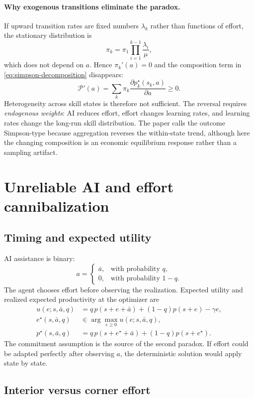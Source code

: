 \documentclass[11pt]{article}
\theoremstyle{tutorial}
\theoremstyle{remark}
\newcommand{\1}{\mathbb{I}}
\newcommand{\calP}{\mathcal{P}}
\begin{document}
\paragraph{Why exogenous transitions eliminate the paradox.}
If upward transition rates are fixed numbers $\lambda_k$ rather than functions of effort, the stationary
distribution is
\[
  \pi_k=\pi_1\prod_{i=1}^{k-1}\frac{\lambda_i}{\mu},
\]
which does not depend on $a$.  Hence $\pi_k'(a)=0$ and the composition term in
\eqref{eq:simpson-decomposition} disappears:
\[
\calP'(a)=\sum_k\pi_k
\frac{\partial p_k^\star(s_k,a)}{\partial a}\ge0.
\]
Heterogeneity across skill states is therefore not sufficient.  The reversal requires \emph{endogenous
weights}: AI reduces effort, effort changes learning rates, and learning rates change the long-run skill
distribution.  The paper calls the outcome Simpson-type because aggregation reverses the within-state
trend, although here the changing composition is an economic equilibrium response rather than a sampling
artifact.

\section{Unreliable AI and effort cannibalization}

\subsection{Timing and expected utility}

AI assistance is binary:
\[
  a=\begin{cases}\bar a,&\text{with probability }q,\\0,&\text{with probability }1-q.\end{cases}
\]
The agent chooses effort before observing the realization.  Expected utility and realized expected
productivity at the optimizer are
\begin{align*}
u(e;s,\bar a,q)&=q\,p(s+e+\bar a)+(1-q)p(s+e)-\gamma e,\\
e^\star(s,\bar a,q)&\in\arg\max_{e\ge0}u(e;s,\bar a,q),\\
p^\star(s,\bar a,q)&=q\,p(s+e^\star+\bar a)+(1-q)p(s+e^\star).
\end{align*}
The commitment assumption is the source of the second paradox.  If effort could be adapted perfectly after
observing $a$, the deterministic solution would apply state by state.

\subsection{Interior versus corner effort}
\end{document}
